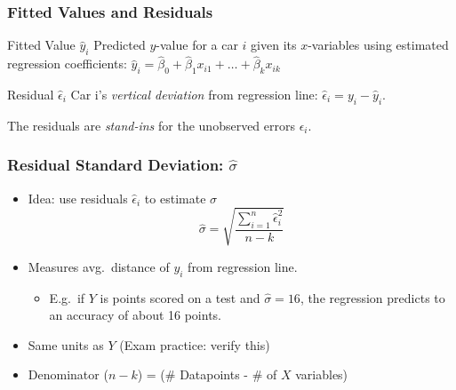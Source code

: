 \documentclass{beamer}
\begin{document}
\begin{frame}
\frametitle{Fitted Values and Residuals}

\begin{block}{Fitted Value $\widehat{y}_i$}
Predicted $y$-value for a car $i$ given its $x$-variables using estimated regression coefficients: \alert{$\widehat{y}_i = \widehat{\beta}_0 + \widehat{\beta}_1 x_{i1} + \hdots + \widehat{\beta}_k x_{ik}$}
\end{block}


\begin{block}{Residual $\widehat{\epsilon}_i$}
  Car i's \emph{vertical deviation} from regression line: \alert{$\widehat{\epsilon}_i = y_i - \widehat{y}_i$}. 
\end{block}

\vspace{1em}
\alert{The residuals are \emph{stand-ins} for the unobserved errors $\epsilon_i$.}

\end{frame}
\begin{frame}
\frametitle{Residual Standard Deviation: $\widehat{\sigma}$}
	\begin{itemize}
    \item Idea: use residuals $\widehat{\epsilon}_i$ to estimate $\sigma$
	$$\widehat{\sigma}  = \sqrt{\frac{\sum_{i=1}^n \widehat{\epsilon}_i^2}{n -k}}$$ 
		\item Measures avg.\ distance of $y_i$ from regression line.
				\begin{itemize}
					\item E.g.\ if $Y$ is points scored on a test and $\widehat{\sigma}=16$, the regression predicts to an accuracy of about 16 points. 
				\end{itemize}
	\item Same units as $Y$ (Exam practice: verify this) 
	\item Denominator  ($n-k$) = (\# Datapoints - \# of $X$ variables) 
	\end{itemize}

\end{frame}
\end{document}
